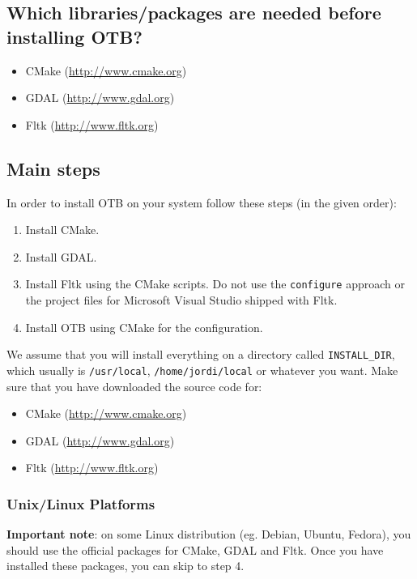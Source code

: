 \subsection{Which libraries/packages are needed before installing
 OTB?}
\begin{itemize}
\item CMake (\url{http://www.cmake.org})
\item GDAL (\url{http://www.gdal.org})
\item Fltk (\url{http://www.fltk.org})
\end{itemize}
       
\subsection{Main steps}
In order to install OTB on your system follow these steps (in the
given order):
\begin{enumerate}
  \item Install CMake.
  \item Install GDAL.
  \item Install Fltk using the CMake scripts. Do not use the
  \texttt{configure} approach or the project files for Microsoft
  Visual Studio shipped with Fltk.
  \item Install OTB using CMake for the configuration.
\end{enumerate}

We assume that you will install everything on a directory called
\texttt{INSTALL\_DIR}, which usually is \texttt{/usr/local}, \texttt{/home/jordi/local} or
whatever you want. Make sure that you have downloaded the source code for:
  \begin{itemize}
  \item CMake (\url{http://www.cmake.org})
  \item GDAL (\url{http://www.gdal.org})
  \item Fltk (\url{http://www.fltk.org})
  \end{itemize}

\subsubsection{Unix/Linux Platforms}

\textbf{Important note}: on some Linux distribution (eg. Debian, Ubuntu, Fedora), you should use 
the official packages for CMake, GDAL and Fltk. Once you have installed these 
packages, you can skip to step 4.

